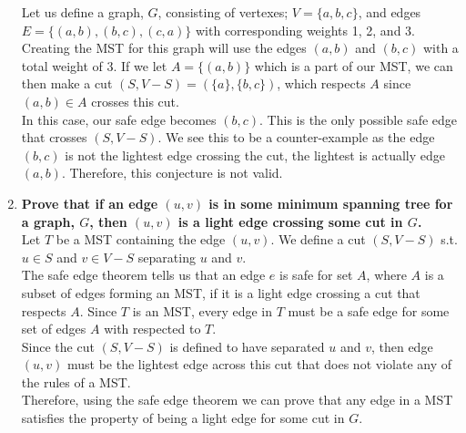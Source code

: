 \documentclass{article}
\begin{document}
\begin{enumerate}
Let us define a graph, $G$, consisting of vertexes; $V = \{ a,b,c \}$, and edges $E = \{ (a,b), (b,c), (c,a) \}$ with corresponding weights 1, 2, and 3. \\
\newline 
Creating the MST for this graph will use the edges $(a,b)$ and $(b,c)$ with a total weight of 3. If we let $A = \{ (a,b) \}$ which is a part of our MST, we can then make a cut $(S, V-S) = (\{a\}, \{b,c\})$, which respects $A$ since $(a,b) \in A$ crosses this cut. \\
\newline 
In this case, our safe edge becomes $(b,c)$. This is the only possible safe edge that crosses $(S, V-S)$. We see this to be a counter-example as the edge $(b,c)$ is not the lightest edge crossing the cut, the lightest is actually edge $(a,b)$. Therefore, this conjecture is not valid. \\
\newline







\item \textbf{ Prove that if an edge $(u,v)$ is in some minimum spanning tree for a graph, $G$, then $(u,v)$ is a light edge crossing some cut in $G$. } \\

Let $T$ be a MST containing the edge $(u,v)$. We define a cut $(S, V-S)$ s.t. $u \in S$ and $v \in V-S$ separating $u$ and $v$. \\
\newline 
The safe edge theorem tells us that an edge $e$ is safe for set $A$, where $A$ is a subset of edges forming an MST, if it is a light edge crossing a cut that respects $A$. Since $T$ is an MST, every edge in $T$ must be a safe edge for some set of edges $A$ with respected to $T$. \\
\newline 
Since the cut $(S, V-S)$ is defined to have separated $u$ and $v$, then edge $(u,v)$ must be the lightest edge across this cut that does not violate any of the rules of a MST. \\
\newline 
Therefore, using the safe edge theorem we can prove that any edge in a MST satisfies the property of being a light edge for some cut in $G$.


\end{enumerate}
\end{document}
